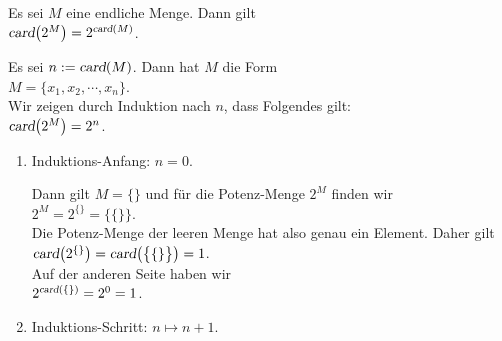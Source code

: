 \begin{Satz}
Es sei $M$ eine endliche Menge.  Dann gilt
\\[0.2cm]
\hspace*{1.3cm}
$\textsl{card}\bigl(2^M\bigr) = 2^{\textsl{card}(M)}$.
\end{Satz}

\proof
Es sei $n := \textsl{card}(M)$.  Dann hat $M$ die Form
\\[0.2cm]
\hspace*{1.3cm}
$M = \{ x_1, x_2, \cdots, x_n \}$.
\\[0.2cm]
Wir zeigen durch Induktion nach $n$, dass Folgendes gilt:
\\[0.2cm]
\hspace*{1.3cm}
$\textsl{card}\bigl(2^M\bigr) = 2^n$.
\begin{enumerate}
\item Induktions-Anfang: $n = 0$.

      Dann gilt  $M = \{\}$ und f\"{u}r die Potenz-Menge $2^M$ finden wir
      \\[0.2cm]
      \hspace*{1.3cm}
      $2^M = 2^{\{\}} = \bigl\{ \{\} \bigr\}$.
      \\[0.2cm]
      Die Potenz-Menge der leeren Menge hat also genau ein Element.  Daher gilt
      \\[0.2cm]
      \hspace*{1.3cm}
      $\textsl{card}\bigl(2^{\{\}}\bigr) = \textsl{card}\bigl(\bigl\{ \{\} \bigr\}\bigr) = 1$.
      \\[0.2cm]
      Auf der anderen Seite haben wir 
      \\[0.2cm]
      \hspace*{1.3cm}
      $2^{\textsl{card}(\{\})} = 2^0 = 1$.
\item Induktions-Schritt: $n \mapsto n + 1$.


\end{enumerate}
